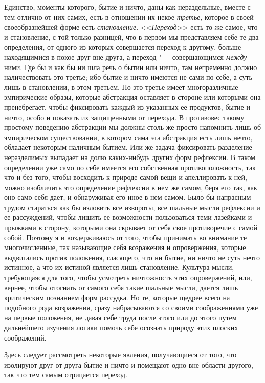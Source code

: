 Единство, моменты которого, бытие и ничто, даны как нераздельные, вместе с
тем отлично от них самих, есть в отношении их некое
{\em третье}, которое в своей своеобразнейшей форме
есть {\em становление}.
<<{\em Переход}>> есть то же самое, что и становление, с
той только разницей, что в первом мы представляем себе те два определения,
от одного из которых совершается переход к другому, больше находящимися в
покое друг вне друга, а переход "---~совершающимся
{\em между} ними. Где бы и как бы ни шла речь о бытии
или ничто, там непременно должно наличествовать это третье; ибо бытие и
ничто имеются не сами по себе, а суть лишь в становлении, в этом третьем.
Но это третье имеет многоразличные эмпирические образы, которые абстракция
оставляет в стороне или которыми она пренебрегает, чтобы фиксировать каждый
из указанных ее продуктов, бытие и ничто, особо и показать их защищенными
от перехода. В противовес такому простому поведению абстракции мы должны
столь же просто напомнить лишь об эмпирическом существовании, в котором
сама эта абстракция есть лишь нечто, обладает некоторым наличным бытием.
Или же задача фиксировать разделение неразделимых выпадает на долю
каких-нибудь других форм рефлексии. В таком определении уже само по себе
имеется его собственная противоположность, так что и без того, чтобы
восходить к природе самой вещи и апеллировать к ней, можно изобличить это
определение рефлексии в нем же самом, беря его так, как оно само себя дает,
и обнаруживая его иное в нем самом. Было бы напрасным трудом стараться
как бы изловить все извороты, все шальные мысли рефлексии и ее рассуждений,
чтобы лишить ее возможности пользоваться теми лазейками и прыжками в
сторону, которыми она скрывает от себя свое противоречие с самой собой.
Поэтому я и воздерживаюсь от того, чтобы принимать во внимание те
многочисленные, так называющие себя возражения и опровержения, которые
выдвигались против положения, гласящего, что ни бытие, ни ничто не суть
нечто истинное, а что их истиной является лишь становление. Культура мысли,
требующаяся для того, чтобы усмотреть ничтожность этих опровержений, или,
вернее, чтобы отогнать от самого себя такие шальные мысли, дается лишь
критическим познанием форм рассудка. Но те, которые щедрее всего на
подобного рода возражения, сразу набрасываются со своими соображениями уже
на первые положения, не давая себе труда после этого или до этого путем
дальнейшего изучения логики помочь себе осознать природу этих плоских
соображений.

Здесь следует рассмотреть некоторые явления, получающиеся от того, что
изолируют друг от друга бытие и ничто и помещают одно вне области другого,
так что тем самым отрицается переход.

